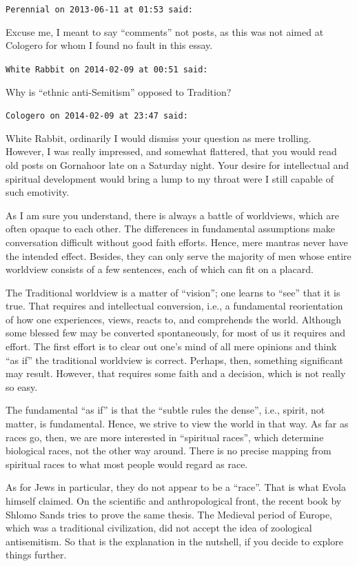 \begin{footnotesize}
\begin{sffamily}
\hfill

\texttt{Perennial on 2013-06-11 at 01:53 said:}

Excuse me, I meant to say ``comments'' not posts, as this was not aimed at Cologero for whom I found no fault in this essay.

\hfill

\texttt{White Rabbit on 2014-02-09 at 00:51 said:}

Why is ``ethnic anti-Semitism'' opposed to Tradition?

\hfill

\texttt{Cologero on 2014-02-09 at 23:47 said:}

White Rabbit, ordinarily I would dismiss your question as mere trolling. However, I was really impressed, and somewhat flattered, that you would read old posts on Gornahoor late on a Saturday night. Your desire for intellectual and spiritual development would bring a lump to my throat were I still capable of such emotivity.

As I am sure you understand, there is always a battle of worldviews, which are often opaque to each other. The differences in fundamental assumptions make conversation difficult without good faith efforts. Hence, mere mantras never have the intended effect. Besides, they can only serve the majority of men whose entire worldview consists of a few sentences, each of which can fit on a placard.

The Traditional worldview is a matter of ``vision''; one learns to ``see'' that it is true. That requires and intellectual conversion, i.e., a fundamental reorientation of how one experiences, views, reacts to, and comprehends the world. Although some blessed few may be converted spontaneously, for most of us it requires and effort. The first effort is to clear out one's mind of all mere opinions and think ``as if'' the traditional worldview is correct. Perhaps, then, something significant may result. However, that requires some faith and a decision, which is not really so easy.

The fundamental ``as if'' is that the ``subtle rules the dense'', i.e., spirit, not matter, is fundamental. Hence, we strive to view the world in that way. As far as races go, then, we are more interested in ``spiritual races'', which determine biological races, not the other way around. There is no precise mapping from spiritual races to what most people would regard as race.

As for Jews in particular, they do not appear to be a ``race''. That is what Evola himself claimed. On the scientific and anthropological front, the recent book by Shlomo Sands tries to prove the same thesis. The Medieval period of Europe, which was a traditional civilization, did not accept the idea of zoological antisemitism. So that is the explanation in the nutshell, if you decide to explore things further.


\end{sffamily}
\end{footnotesize}
